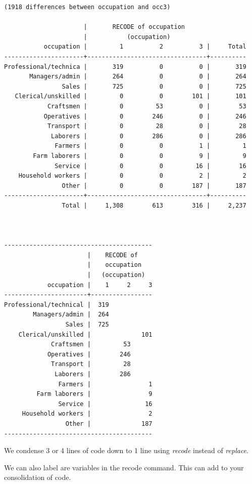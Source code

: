 \documentclass[
]{book}
\begin{document}
\begin{verbatim}
(1918 differences between occupation and occ3)

                      |       RECODE of occupation
                      |           (occupation)
           occupation |         1          2          3 |     Total
----------------------+---------------------------------+----------
Professional/technica |       319          0          0 |       319 
       Managers/admin |       264          0          0 |       264 
                Sales |       725          0          0 |       725 
   Clerical/unskilled |         0          0        101 |       101 
            Craftsmen |         0         53          0 |        53 
           Operatives |         0        246          0 |       246 
            Transport |         0         28          0 |        28 
             Laborers |         0        286          0 |       286 
              Farmers |         0          0          1 |         1 
        Farm laborers |         0          0          9 |         9 
              Service |         0          0         16 |        16 
    Household workers |         0          0          2 |         2 
                Other |         0          0        187 |       187 
----------------------+---------------------------------+----------
                Total |     1,308        613        316 |     2,237 



-----------------------------------------
                       |    RECODE of    
                       |    occupation   
                       |   (occupation)  
            occupation |    1     2     3
-----------------------+-----------------
Professional/technical |  319            
        Managers/admin |  264            
                 Sales |  725            
    Clerical/unskilled |              101
             Craftsmen |         53      
            Operatives |        246      
             Transport |         28      
              Laborers |        286      
               Farmers |                1
         Farm laborers |                9
               Service |               16
     Household workers |                2
                 Other |              187
-----------------------------------------
\end{verbatim}

We condense 3 or 4 lines of code down to 1 line using \emph{recode} instead of \emph{replace}.

We can also label are variables in the recode command. This can add to your consolidation of code.
\end{document}
